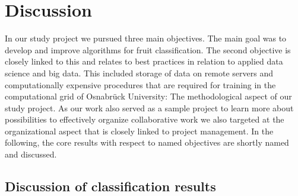 \section{Discussion}

In our study project we pursued three main objectives. The main goal was to develop and improve algorithms for fruit classification. The second objective is closely linked to this and relates to best practices in relation to applied data science and big data. This included storage of data on remote servers and computationally expensive procedures that are required for training in the computational grid of Osnabrück University: The methodological aspect of our study project. As our work also served as a sample project to learn more about possibilities to effectively organize collaborative work we also targeted at the organizational aspect that is closely linked to project management. In the following, the core results with respect to named objectives are shortly named and discussed.


\subsection{Discussion of classification results}


